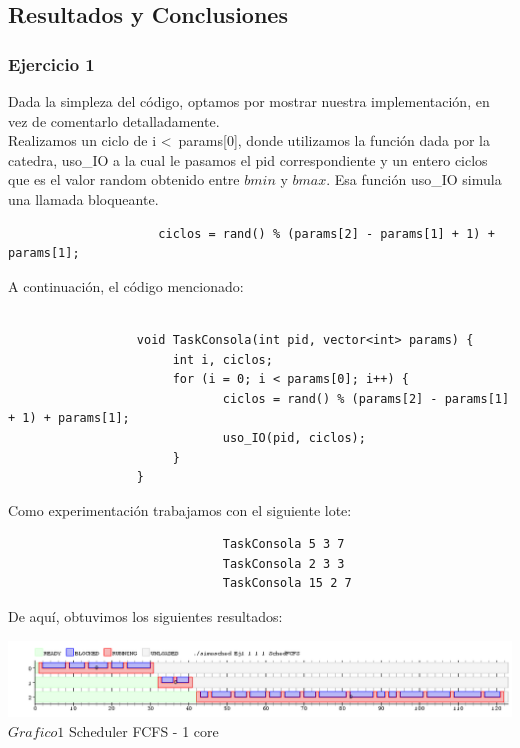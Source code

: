 \subsection{Resultados y Conclusiones}

\subsubsection[Resolución Ejercicio 1]{Ejercicio 1}

\indent Dada la simpleza del código, optamos por mostrar nuestra implementación, en vez de comentarlo detalladamente.\\
\indent Realizamos un ciclo de i \textless \ params[0], donde utilizamos la función dada por la catedra, uso\_IO a la cual le pasamos
el pid correspondiente y un entero ciclos que es el valor random obtenido entre $bmin$ y $bmax$. Esa función uso\_IO simula una llamada bloqueante.
\begin{center}
 \begin{verbatim}
                     ciclos = rand() % (params[2] - params[1] + 1) + params[1];
 \end{verbatim}

\end{center}

\indent A continuaci\'{o}n, el c\'{o}digo mencionado:

\begin{verbatim}

                  void TaskConsola(int pid, vector<int> params) {
                       int i, ciclos;              
                       for (i = 0; i < params[0]; i++) {
                              ciclos = rand() % (params[2] - params[1] + 1) + params[1];  
                              uso_IO(pid, ciclos);
                       }
                  } 

\end{verbatim}

\indent Como experimentaci\'{o}n trabajamos con el siguiente lote:\\

\begin{verbatim}
                              TaskConsola 5 3 7
                              TaskConsola 2 3 3
                              TaskConsola 15 2 7
\end{verbatim}

De aqu\'{i}, obtuvimos los siguientes resultados:\\

\vspace*{0.3cm} \vspace*{0.3cm}
  \begin{center}
 \includegraphics[scale=0.5]{./Test/ej1.png}
 { $Grafico 1$ Scheduler FCFS - 1 core }
 \end{center}
  \vspace*{0.3cm}



